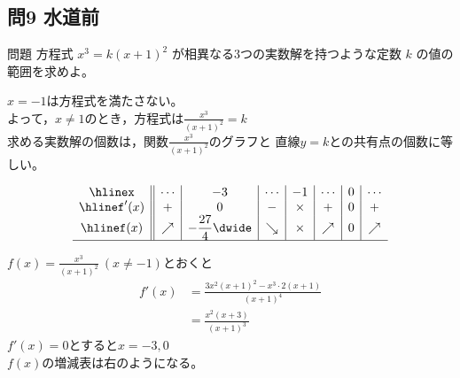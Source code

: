 \documentclass[a5paper]{ltjsarticle}
\begin{document}
\subsection*{問9 水道前}
\begin{itembox}[l]{問題}
  方程式 $ x^3=k{(x+1)}^2$ が相異なる3つの実数解を持つような定数 $ k$ の値の範囲を求めよ。
\end{itembox}

  $x=-1$は方程式を満たさない。\\
  よって，$x\neq 1$のとき，方程式は\qquad $\displaystyle \frac{x^3}{{(x+1)}^2}=k$\\%
  求める実数解の個数は，関数$\displaystyle\frac{x^3}{{(x+1)}^2}$のグラフと
  直線$y=k$との共有点の個数に等しい。\\
  \begin{wrapfigure}{r}{60mm}
    \vspace{-10mm}
    \begin{equation*}
      \begin{array}{c||c|c|c|c|c|c|c}%
        \hline%
        x&\cdots&-3&\cdots&-1&\cdots&0&\cdots\\ \hline%
        f'(x)&+&0&-&\times&+&0&+\\ \hline%
        f(x)&\nearrow&-\dfrac{27}{4}\dwide&\searrow &\times&\nearrow &0&\nearrow\\ \hline%
      \end{array} 
    \end{equation*}
    \vspace{-10mm}
  \end{wrapfigure}
$\displaystyle f(x)=\frac{x^3}{{(x+1)}^2}\:(x\neq -1)$とおくと%
\begin{align*}
  f'(x)&=\frac{3x^2{(x+1)}^2-x^3\cdot 2(x+1)}{{(x+1)}^4}\\
&=\frac{x^2(x+3)}{{(x+1)}^3}
\end{align*}
$f'(x)=0$とすると\qquad$x=-3,0$\\
$f(x)$の増減表は右のようになる。
\end{document}
